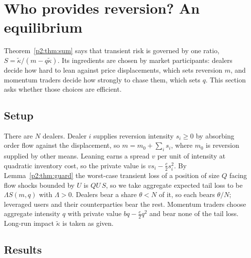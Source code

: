 \section{Who provides reversion? An equilibrium}\label{p2:sec:equil}

Theorem~\ref{p2:thm:sum} says that transient risk is governed by one ratio, $S=\tilde\kappa/(m-q\tilde\kappa)$. Its ingredients are chosen by market participants: dealers decide how hard to lean against price displacements, which sets reversion $m$, and momentum traders decide how strongly to chase them, which sets $q$. This section asks whether those choices are efficient.

\subsection{Setup}
There are $N$ dealers. Dealer $i$ supplies reversion intensity $s_i\ge0$ by absorbing order flow against the displacement, so $m=m_0+\sum_is_i$, where $m_0$ is reversion supplied by other means. Leaning earns a spread $v$ per unit of intensity at quadratic inventory cost, so the private value is $vs_i-\tfrac c2s_i^2$. By Lemma~\ref{p2:thm:guard} the worst-case transient loss of a position of size $Q$ facing flow shocks bounded by $U$ is $QU\,S$, so we take aggregate expected tail loss to be $\Lambda S(m,q)$ with $\Lambda>0$. Dealers bear a share $\theta<N$ of it, so each bears $\theta/N$; leveraged users and their counterparties bear the rest. Momentum traders choose aggregate intensity $q$ with private value $bq-\tfrac e2q^2$ and bear none of the tail loss. Long-run impact $\tilde\kappa$ is taken as given.

\subsection{Results}

